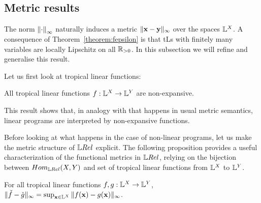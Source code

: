 \subsection{Metric results}%


The norm $\left\lVert\cdot\right\rVert_\infty$ naturally induces a metric $\|\mathbf{x}-\mathbf{y}\|_{\infty}$ over the spaces $\mathbb{L}^{X}$. 
A consequence of Theorem~\ref{theorem:fepsilon} is that tLs with finitely many variables are locally Lipschitz on all $\mathbb{R}_{>0}$.
In this subsection we will refine and generalise this result.
%

Let us first look at tropical linear functions:


\begin{proposition}\label{prop:troplinear}
All tropical linear functions $f: \mathbb{L}^{X}\to \mathbb{L}^{Y}$ are non-expansive.  
\end{proposition}
This result shows that, in analogy with that happens in usual metric semantics, linear programs are interpreted by non-expansive functions. 

Before looking at what happens in the case of non-linear programs, let us make the metric structure of $\LREL$ explicit. 
The following proposition provides a useful characterization of the functional metrics in $\LREL$, relying on 
the bijection between $\HOM{\LREL}{X}{Y}$ and set of tropical linear functions from $\mathbb{L}^{X}$ to $\mathbb{L}^{Y}$.
\begin{proposition}
For all tropical linear functions $f,g:\mathbb{L}^{X}\to \mathbb{L}^{Y}$, $\| \check f-\check g\|_{\infty} =  \sup_{\mathbf{x}\in \mathbb{L}^{X}}
\| f(\mathbf{x})-g(\mathbf{x})\|_{\infty}$.\end{proposition}

